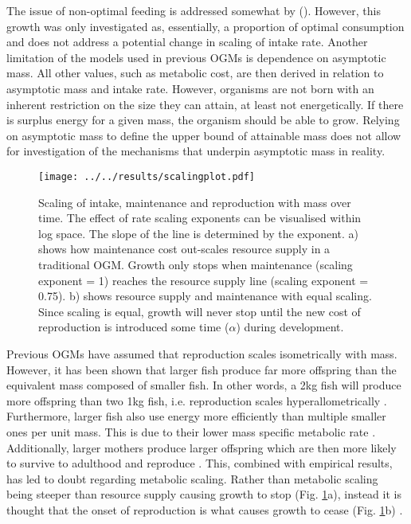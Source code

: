 \documentclass[a4paper, 11pt, hidelinks]{article} %
\begin{document}
	The issue of non-optimal feeding is addressed somewhat by \citeauthor{Hou2011} (\citeyear{Hou2011}).  However, this growth was only investigated as, essentially, a proportion of optimal consumption and does not address a potential change in scaling of intake rate.
	Another limitation of the models used in previous OGMs is dependence on asymptotic mass.  
	All other values, such as metabolic cost, are then derived in relation to asymptotic mass and intake rate.  However, organisms are not born with an inherent restriction on the size they can attain, at least not energetically.  If there is surplus energy for a given mass, the organism should be able to grow.  Relying on asymptotic mass to define the upper bound of attainable mass does not allow for investigation of the mechanisms that underpin asymptotic mass in reality. 
	\begin{figure}[h!]
		\centering
		\texttt{[image: ../../results/scalingplot.pdf]}
		\caption{Scaling of intake, maintenance and reproduction with mass over time.  The effect of rate scaling exponents can be visualised within log space.  The slope of the line is determined by the exponent.  a) shows how maintenance cost out-scales resource supply in a traditional OGM.  Growth only stops when maintenance (scaling exponent = 1) reaches the resource supply line (scaling exponent = 0.75).  b) shows resource supply and maintenance with equal scaling. Since scaling is equal, growth will never stop until the new cost of reproduction is introduced some time ($\alpha$) during development.}
		\label{scaling_plot}
	\end{figure}
	
	Previous OGMs have assumed that reproduction scales isometrically with mass.  
	However, it has been shown that larger fish produce far more offspring than the equivalent mass composed of smaller fish.  In other words, a 2kg fish will produce more offspring than two 1kg fish, i.e. reproduction scales hyperallometrically \parencite{Barneche2018}.
	Furthermore, larger fish also use energy more efficiently than multiple smaller ones per unit mass.  This is due to their lower mass specific metabolic rate \parencite{Peters1983, Kleiber1932, Brown2004}.  
	Additionally, larger mothers produce larger offspring which are then more likely to survive to adulthood and reproduce \parencite{Hixon2014, Marshall2006}. 
	This, combined with empirical results, has led to doubt regarding metabolic scaling.  Rather than metabolic scaling being steeper than resource supply causing growth to stop (Fig. \ref{scaling_plot}a), instead it is thought that the onset of reproduction is what causes growth to cease (Fig. \ref{scaling_plot}b) \parencite{Marshall2019, Sibly2020}.
	
\end{document}
